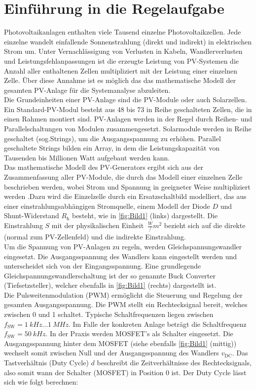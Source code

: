\section{Einführung in die Regelaufgabe} \label{sec:Einfuehrung}

Photovoltaikanlagen enthalten viele Tausend einzelne Photovoltaikzellen. Jede einzelne wandelt einfallende Sonnenstrahlung (direkt und indirekt) in elektrischen Strom um. Unter Vernachlässigung von Verlusten in Kabeln, Wandlerverlusten und Leistungsfehlanpassungen ist die erzeugte Leistung von PV-Systemen die Anzahl aller enthaltenen Zellen multipliziert mit der Leistung einer einzelnen Zelle. Über diese Annahme ist es möglich das das mathematische Modell der gesamten PV-Anlage für die Systemanalyse abzuleiten. \\
Die Grundeinheiten einer PV-Anlage sind die PV-Module oder auch Solarzellen. Ein Standard-PV-Modul besteht aus 48 bis 73 in Reihe geschalteten Zellen, die in einen Rahmen montiert sind. PV-Anlagen werden in der Regel durch Reihen- und Parallelschaltungen von Modulen zusammengesetzt. Solarmodule werden in Reihe geschaltet (sog.\xspace \glqq Strings\grqq{}), um die Ausgangsspannung zu erhöhen. Parallel geschaltete Strings bilden ein \glqq Array\grqq{}, in dem die Leistungskapazität von Tausenden bis Millionen Watt aufgebaut werden kann. \\
Das mathematische Modell des PV-Generators ergibt sich aus der Zusammenfassung aller PV-Module, die durch das Modell einer einzelnen Zelle beschrieben werden, wobei Strom und Spannung in geeigneter Weise multipliziert werden .Dazu wird die Einzelzelle durch ein Ersatzschaltbild modelliert, das aus einer einstrahlungsabhängigen Stromquelle, einem Modell der Diode $D$ und Shunt-Widerstand $R_{\mathrm{h}}$ besteht, wie in \autoref{fig:Bild1} (links) dargestellt. Die Einstrahlung $S$ mit der physikalischen Einheit $\SI{}{\frac{W}/{m^2}}$ bezieht sich auf die direkte (normal zum PV-Zellenfeld) und die indirekte Einstrahlung. \\
\newline
Um die Spannung von PV-Anlagen zu regeln, werden Gleichspannungswandler eingesetzt. Die Ausgangsspannung des Wandlers kann eingestellt werden und unterscheidet sich von der Eingangsspannung. Eine grundlegende Gleichspannungswandlerschaltung ist der so genannte Buck Converter (Tiefsetzsteller), welcher ebenfalls in \autoref{fig:Bild1} (rechts) dargestellt ist. \\
Die Pulsweitenmodulation (PWM) ermöglicht die Steuerung und Regelung der gesamten Ausgangsspannung. Die PWM stellt ein Rechtecksignal bereit, welches zwischen 0 und 1 schaltet. Typische Schaltfrequenzen liegen zwischen $f_{\mathrm{SW}} = \SI{1}{kHz} \ldots \SI{1}{MHz}$. Im Falle der konkreten Anlage beträgt die Schaltfrequenz $f_{\mathrm{SW}} = \SI{50}{kHz}$. In der Praxis werden \zB MOSFET's als Schalter eingesetzt. Die Ausgangsspannung hinter dem MOSFET (siehe ebenfalls \autoref{fig:Bild1} (mittig)) wechselt somit zwischen Null und der Ausgangsspannung des Wandlers $v_{\mathrm{DC}}$. Das Tastverhältnis (Duty Cycle) $d$ beschreibt die Zeitverhältnisse des Rechtecksignals, also somit wann der Schalter (MOSFET) in Position 0  ist. Der Duty Cycle lässt sich wie folgt berechnen:

